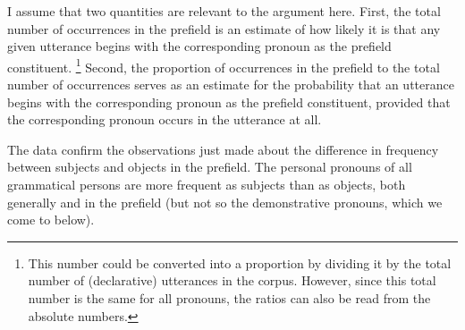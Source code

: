 \noindent
I assume that two quantities are relevant to the argument here.
First, the total number of occurrences in the prefield is an estimate of how likely it is that any given utterance begins with the corresponding pronoun as the prefield constituent.%
\footnote{This number could be converted into a proportion by dividing it by the total number of (declarative) utterances in the corpus.
However, since this total number is the same for all pronouns, the ratios can also be read from the absolute numbers.}
%
Second, the proportion of occurrences in the prefield to the total number of occurrences serves as an estimate for the probability that an utterance begins with the corresponding pronoun as the prefield constituent, provided that the corresponding pronoun occurs in the utterance at all. 

The data confirm the observations just made about the difference in frequency between subjects and objects in the prefield.
The personal pronouns of all grammatical persons are more frequent as subjects than as objects, both generally and in the prefield (but not so the demonstrative pronouns, which we come to below).

